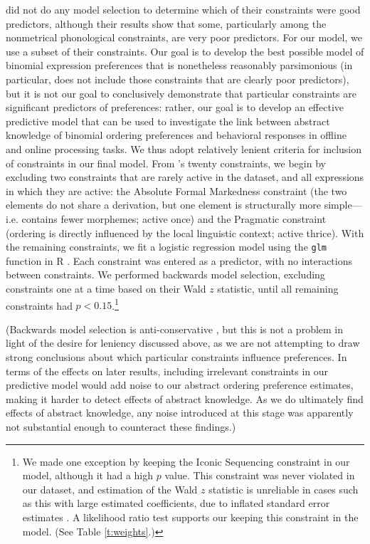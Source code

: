 \documentclass[authoryear]{elsarticle}
\begin{document}
\citeauthor{Benor:2006gv} did not do any model selection to determine which of their constraints were good predictors, although their results show that some, particularly among the nonmetrical phonological constraints, are very poor predictors. For our model, we use a subset of their constraints. Our goal is to develop the best possible model of binomial expression preferences that is nonetheless reasonably parsimonious (in particular, does not include those constraints that are clearly poor predictors), but it is not our goal to conclusively demonstrate that particular constraints are significant predictors of preferences: rather, our goal is to develop an effective predictive model that can be used to investigate the link between abstract knowledge of binomial ordering preferences and behavioral responses in offline and online processing tasks. We thus adopt relatively lenient criteria for inclusion of constraints in our final model. From \citeauthor{Benor:2006gv}'s twenty constraints, we begin by excluding two constraints that are rarely active in the dataset, and all expressions in which they are active: the Absolute Formal Markedness constraint (the two elements do not share a derivation, but one element is structurally more simple---i.e. contains fewer morphemes; active once) and the Pragmatic constraint (ordering is directly influenced by the local linguistic context; active thrice). With the remaining constraints, we fit a logistic regression model using the {\tt glm} function in R \citep{RCoreTeam:2014wf}. Each constraint was entered as a predictor, with no interactions between constraints. We performed backwards model selection, excluding constraints one at a time based on their Wald $z$ statistic, until all remaining constraints had $p < 0.15$.\footnote{\label{waldz}We made one exception by keeping the Iconic Sequencing constraint in our model, although it had a high $p$ value. This constraint was never violated in our dataset, and estimation of the Wald $z$ statistic is unreliable in cases such as this with large estimated coefficients, due to inflated standard error estimates \citep{Agresti:2002vi,Menard:2002tc}. A likelihood ratio test supports our keeping this constraint in the model. (See Table \ref{t:weights}.)}

(Backwards model selection is anti-conservative \citep{Harrell:2001jr}, but this is not a problem in light of the desire for leniency discussed above, as we are not attempting to draw strong conclusions about which particular constraints influence preferences. In terms of the effects on later results, including irrelevant constraints in our predictive model would add noise to our abstract ordering preference estimates, making it harder to detect effects of abstract knowledge. As we do ultimately find effects of abstract knowledge, any noise introduced at this stage was apparently not substantial enough to counteract these findings.)
\end{document}
